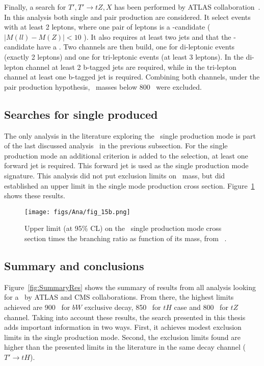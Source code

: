 Finally, a search for $T',T'\rightarrow tZ,X$ has been performed by ATLAS collaboration~\cite{Aad:2014efa}. In this analysis both single and pair production are considered. It select events with at least 2 leptons, where one pair of leptons is a \Z-candidate ($|M(ll)-M(Z)|<10$ \GeVcc). It also requires at least two jets and that the \Z-candidate have a . Two channels are then build, one for di-leptonic events (exactly 2 leptons) and one for tri-leptonic events (at least 3 leptons). In the di-lepton channel at least 2 b-tagged jets are required, while in the tri-lepton channel at least one b-tagged jet is required. Combining both channels, under the pair production hypothesis, \Tp~masses below 800 \GeVcc~were excluded.

\subsection{Searches for single produced \Tp}
\label{sec:singleanal}

The only analysis in the literature exploring the \Tp~single production mode is part of the last discussed analysis~\cite{Aad:2014efa} in the previous subsection. For the single production mode an additional criterion is added to the selection, at least one forward jet is required. This forward jet is used as the single production mode signature. This analysis did not put exclusion limits on \Tp~mass, but did established an upper limit in the single mode production cross section. Figure~\ref{fig:SingleATLASres} shows these results.

\begin{figure}[!Hhtbp]
  \begin{center}
    \texttt{[image: figs/Ana/fig\_15b.png]}
    \caption{Upper limit (at 95\% CL) on the \Tp~single production mode cross section times the branching ratio as function of its mass, from ~\cite{Aad:2014efa}.}
    \label{fig:SingleATLASres}
  \end{center}
\end{figure}

\subsection{Summary and conclusions}
\label{sec:SumCon}

Figure~\ref{fig:SummaryRes} shows the summary of results from all analysis looking for a \Tp~by ATLAS and CMS collaborations. From there, the highest limits achieved are 900 \GeVcc~for $bW$ exclusive decay, 850 \GeVcc~for $tH$ case and 800 \GeVcc~for $tZ$ channel. Taking into account these results, the search presented in this thesis adds important information in two ways. First, it achieves modest exclusion limits in the single production mode. Second, the exclusion limits found are higher than the presented limits in the literature in the same decay channel ($T'\rightarrow tH$). 

